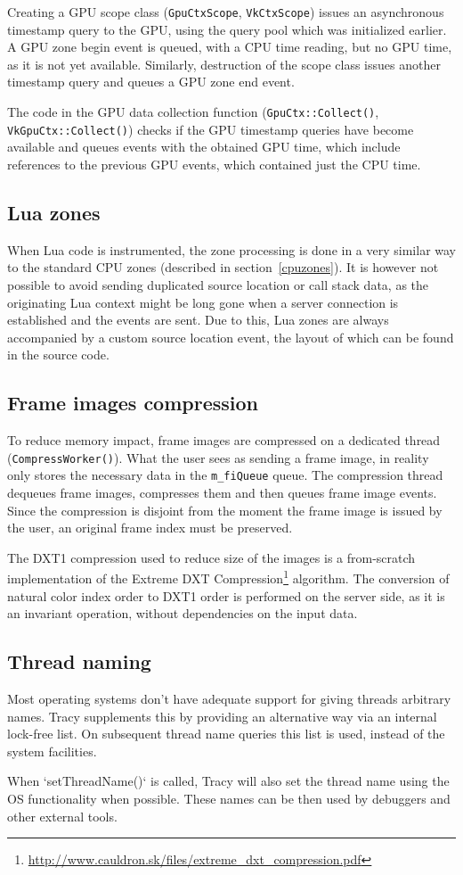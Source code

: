 \documentclass[hidelinks,titlepage,a4paper]{article}
\begin{document}
Creating a GPU scope class (\texttt{GpuCtxScope}, \texttt{VkCtxScope}) issues an asynchronous timestamp query to the GPU, using the query pool which was initialized earlier. A GPU zone begin event is queued, with a CPU time reading, but no GPU time, as it is not yet available. Similarly, destruction of the scope class issues another timestamp query and queues a GPU zone end event.

The code in the GPU data collection function (\texttt{GpuCtx::Collect()}, \texttt{VkGpuCtx::Collect()}) checks if the GPU timestamp queries have become available and queues events with the obtained GPU time, which include references to the previous GPU events, which contained just the CPU time.

\subsection{Lua zones}

When Lua code is instrumented, the zone processing is done in a very similar way to the standard CPU zones (described in section~\ref{cpuzones}). It is however not possible to avoid sending duplicated source location or call stack data, as the originating Lua context might be long gone when a server connection is established and the events are sent. Due to this, Lua zones are always accompanied by a custom source location event, the layout of which can be found in the source code.

\subsection{Frame images compression}
\label{fithread}

To reduce memory impact, frame images are compressed on a dedicated thread (\texttt{CompressWorker()}). What the user sees as sending a frame image, in reality only stores the necessary data in the \texttt{m\_fiQueue} queue. The compression thread dequeues frame images, compresses them and then queues frame image events. Since the compression is disjoint from the moment the frame image is issued by the user, an original frame index must be preserved.

The DXT1 compression used to reduce size of the images is a from-scratch implementation of the Extreme DXT Compression\footnote{\url{http://www.cauldron.sk/files/extreme_dxt_compression.pdf}} algorithm. The conversion of natural color index order to DXT1 order is performed on the server side, as it is an invariant operation, without dependencies on the input data.

\subsection{Thread naming}

Most operating systems don't have adequate support for giving threads arbitrary names. Tracy supplements this by providing an alternative way via an internal lock-free list. On subsequent thread name queries this list is used, instead of the system facilities.

When `setThreadName()` is called, Tracy will also set the thread name using the OS functionality when possible. These names can be then used by debuggers and other external tools.
\end{document}
